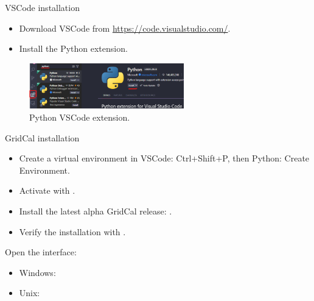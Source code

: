 \begin{frame}{VSCode installation}
    \begin{itemize}
        \item Download VSCode from \href{https://code.visualstudio.com/}{https://code.visualstudio.com/}.
        \item Install the Python extension.
    \end{itemize}
        \begin{figure}[!htb]
        \centering
        \includegraphics[width=0.6\textwidth]{Images/python_vscode.png}
        \caption{Python VSCode extension.}
        \label{fig:vscode_installation}
    \end{figure}
\end{frame}

\begin{frame}{GridCal installation}
    \begin{itemize}
        \item Create a virtual environment in VSCode: Ctrl+Shift+P,  then Python: Create Environment.
        \item Activate with .
        \item Install the latest alpha GridCal release: .
        \item Verify the installation with .
    \end{itemize}
    Open the interface:
    \begin{itemize}
        \item Windows: 
        \begin{center}
        \end{center}
        \item Unix: 
        \begin{center}
        \end{center}
    \end{itemize}
\end{frame}
